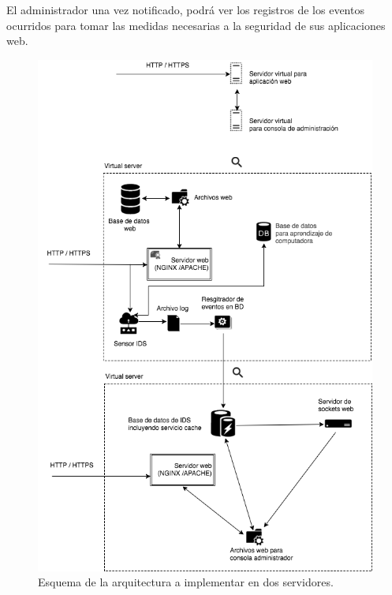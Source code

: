 El administrador una vez notificado, podrá ver los registros de los eventos ocurridos para tomar las medidas necesarias a la seguridad de sus aplicaciones web.\\


\begin{figure}
	\centering
	\includegraphics[scale=.6]{images/Diagrama_de_despliegue_1_server}
	\caption{Esquema de la arquitectura a implementar en dos servidores.}
	\label{fig:arqui_server}
\end{figure}


